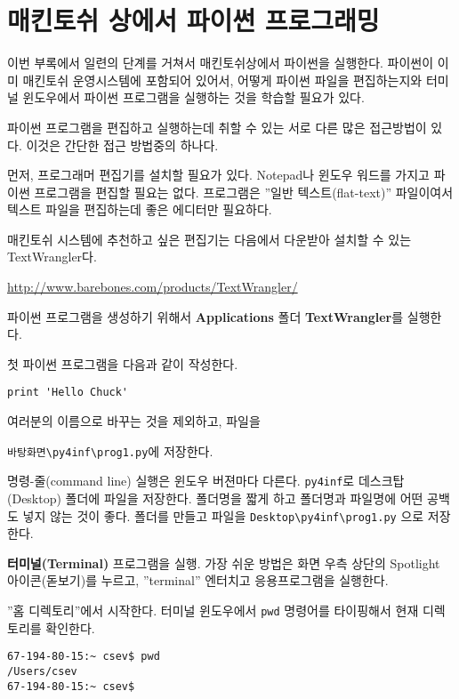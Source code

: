 
\chapter{매킨토쉬 상에서 파이썬 프로그래밍}

이번 부록에서 일련의 단계를 거쳐서 매킨토쉬상에서 파이썬을 실행한다.
파이썬이 이미 매킨토쉬 운영시스템에 포함되어 있어서,
어떻게 파이썬 파일을 편집하는지와 터미널 윈도우에서 파이썬 프로그램을 실행하는 것을 학습할 필요가 있다.

파이썬 프로그램을 편집하고 실행하는데 취할 수 있는 서로 다른 많은 접근방법이 있다. 이것은 간단한 접근 방법중의 하나다.

먼저, 프로그래머 편집기를 설치할 필요가 있다.
Notepad나 윈도우 워드를 가지고 파이썬 프로그램을 편집할 필요는 없다.
프로그램은 ''일반 텍스트(flat-text)'' 파일이여서 텍스트 파일을 편집하는데 좋은 에디터만 필요하다.

매킨토쉬 시스템에 추천하고 싶은 편집기는 다음에서 다운받아 설치할 수 있는 TextWrangler다.

\url{http://www.barebones.com/products/TextWrangler/}

파이썬 프로그램을 생성하기 위해서 {\bf Applications} 폴더 {\bf TextWrangler}를 실행한다.

첫 파이썬 프로그램을 다음과 같이 작성한다.

\beforeverb
\begin{verbatim}
print 'Hello Chuck'
\end{verbatim}
\afterverb
%


여러분의 이름으로 바꾸는 것을 제외하고, 파일을 


{\tt 바탕화면{\textbackslash}py4inf{\textbackslash}prog1.py}에 저장한다.

명령-줄(command line) 실행은 윈도우 버젼마다 다른다. {\tt py4inf}로 데스크탑(Desktop) 폴더에 파일을 저장한다.
폴더명을 짧게 하고 폴더명과 파일명에 어떤 공백도 넣지 않는 것이 좋다.
폴더를 만들고 파일을 {\tt Desktop{\textbackslash}py4inf{\textbackslash}prog1.py} 으로 저장한다.

{\bf 터미널(Terminal)} 프로그램을 실행. 가장 쉬운 방법은 화면 우측 상단의 Spotlight 아이콘(돋보기)를 누르고,
''terminal'' 엔터치고 응용프로그램을 실행한다.

''홈 디렉토리''에서 시작한다. 터미널 윈도우에서 {\tt pwd} 명령어를 타이핑해서 현재 디렉토리를 확인한다.

\beforeverb
\begin{verbatim}
67-194-80-15:~ csev$ pwd
/Users/csev
67-194-80-15:~ csev$ 
\end{verbatim}
\afterverb
%

